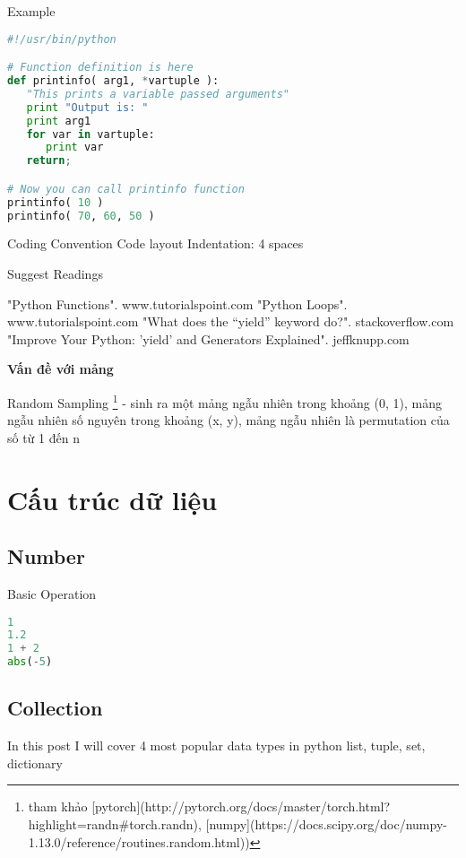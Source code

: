 Example

\begin{lstlisting}[language=Python]
#!/usr/bin/python

# Function definition is here
def printinfo( arg1, *vartuple ):
   "This prints a variable passed arguments"
   print "Output is: "
   print arg1
   for var in vartuple:
      print var
   return;

# Now you can call printinfo function
printinfo( 10 )
printinfo( 70, 60, 50 )
\end{lstlisting}

Coding Convention
Code layout
Indentation: 4 spaces

Suggest Readings

"Python Functions". www.tutorialspoint.com
"Python Loops". www.tutorialspoint.com
"What does the “yield” keyword do?". stackoverflow.com
"Improve Your Python: 'yield' and Generators Explained". jeffknupp.com

\textbf{Vấn đề với mảng}

\begin{item}
  \item Random Sampling \footnote{tham khảo [pytorch](http://pytorch.org/docs/master/torch.html?highlight=randn#torch.randn), [numpy](https://docs.scipy.org/doc/numpy-1.13.0/reference/routines.random.html))} - sinh ra một mảng ngẫu nhiên trong khoảng (0, 1), mảng ngẫu nhiên số nguyên trong khoảng (x, y), mảng ngẫu nhiên là permutation của số từ 1 đến n
\end{item}

\section{Cấu trúc dữ liệu}

\subsection{Number}

Basic Operation

\begin{lstlisting}[language=Python]
1
1.2
1 + 2
abs(-5)
\end{lstlisting}

\subsection{Collection}

In this post I will cover 4 most popular data types in python list, tuple, set, dictionary

